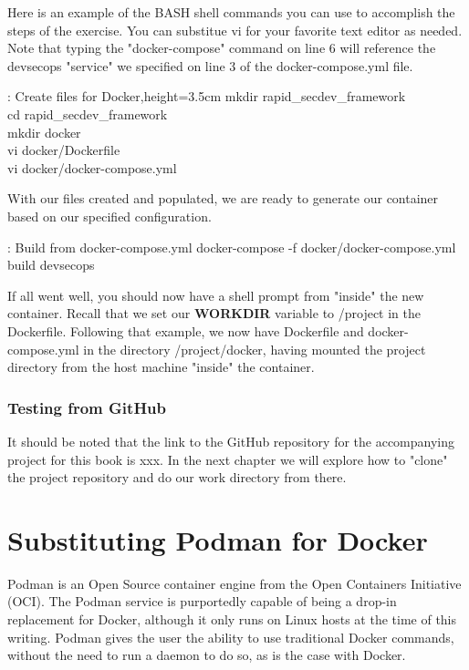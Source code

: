 \justify
Here is an example of the BASH shell commands you can use to accomplish
the steps of the exercise. You can substitue vi for your favorite text
editor as needed. Note that typing the "docker-compose" command on line
6 will reference the devsecops "service" we specified on line 3 of the
docker-compose.yml file.

\justify
\begin{mybox}{\thetcbcounter: Create files for Docker,height=3.5cm}
mkdir rapid\_secdev\_framework\\
cd rapid\_secdev\_framework\\
mkdir docker\\
vi docker/Dockerfile\\
vi docker/docker-compose.yml
\end{mybox}

\justify
With our files created and populated, we are ready to generate our
container based on our specified configuration.

\begin{mybox}{\thetcbcounter: Build from docker-compose.yml }
docker-compose -f docker/docker-compose.yml build devsecops
\end{mybox}

\justify
If all went well, you should now have a shell prompt from "inside" the
new container. Recall that we set our \textbf{WORKDIR} variable to /project in the Dockerfile. Following that example, we now have Dockerfile and docker-compose.yml in the directory /project/docker, having mounted the project directory from the host machine "inside" the container.

\subsubsection{Testing from GitHub}
\justify
It should be noted that the link to the GitHub repository
for the accompanying project for this book is xxx. In the next chapter 
we will explore how to "clone" the project repository and do our work directory from there.

\section{Substituting Podman for Docker}
\justify
Podman is an Open Source container engine from the Open Containers Initiative (OCI). The Podman service is purportedly capable of being a drop-in replacement for Docker, although it only runs on Linux hosts at the time of this writing. Podman gives the user the ability to use traditional Docker commands, without the need to run a daemon to do so,
as is the case with Docker.

